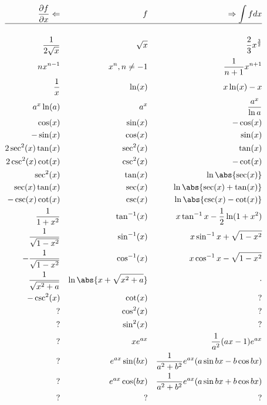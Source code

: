 \begin{align*}
\frac{\partial f}{\partial{x}}\Leftarrow &  & f                       &  & \Rightarrow\int f dx   \\
\hline \\
\frac{1}{2\sqrt{x}}                      &  & \sqrt{x}                &  & \frac{2}{3}x^{\frac{3}{2}} \\
nx^{n-1}                                 &  & x^n, n \neq -1          &  & \frac{1}{n+1}x^{n+1} \\
\frac{1}{x}                              &  & {\ln(x)}                &  & x\ln(x) - x \\
a^x\ln(a)                                &  & a^x                     &  & \frac{a^x}{\ln a} \\
\cos(x)                                  &  & \sin(x)                 &  & -\cos(x) \\
-\sin(x)                                 &  & \cos(x)                 &  & \sin(x) \\
2\sec^2(x)\tan(x)                        &  & \sec^2(x)               &  & \tan(x) \\
2\csc^2(x)\cot(x)                        &  & \csc^2(x)               &  & -\cot(x) \\
\sec^2(x)                                &  & \tan(x)                 &  & \ln\abs{\sec(x)} \\
\sec(x)\tan(x)                           &  & \sec(x)                 &  & \ln\abs{\sec(x) + \tan(x)} \\
-\csc(x)\cot(x)                          &  & \csc(x)                 &  & \ln\abs{\csc(x)-\cot(x)} \\
\frac{1}{1+x^2}                          &  & {\tan^{-1}(x)}          &  & x\tan^{-1}x - \frac{1}{2}\ln(1+x^2) \\
\frac{1}{\sqrt{1-x^2}}                   &  & {\sin^{-1}(x)}          &  & x\sin^{-1}x+ \sqrt{1-x^2} \\
-\frac{1}{\sqrt{1-x^2}}                  &  & {\cos^{-1}(x)}          &  & x\cos^{-1}x -\sqrt{1-x^2} \\
\frac{1}{\sqrt{x^2+a}}                   &  & \ln\abs{x+\sqrt{x^2+a}} &  & \cdot\\
-\csc^2(x)                               &  & \cot(x)                 &  & ? \\
?                                        &  & \cos^2(x)               &  & ? \\
?                                        &  & \sin^2(x)               &  & ? \\
?                                        &  & xe^{ax}                 &  & \frac { 1 } { a ^ { 2 } } ( a x - 1 ) e ^ { a x } \\
?                                        &  & e^{ax}\sin(bx)          &  & \frac { 1 } { a ^ { 2 } + b ^ { 2 } } e ^ { a x } ( a \sin b x - b \cos b x ) \\
?                                        &  & e^{ax}\cos(bx)          &  & \frac { 1 } { a ^ { 2 } + b ^ { 2 } } e ^ { a x } ( a \sin b x + b \cos b x ) \\
?                                        &  & ?                       &  & ?
\end{align*}

